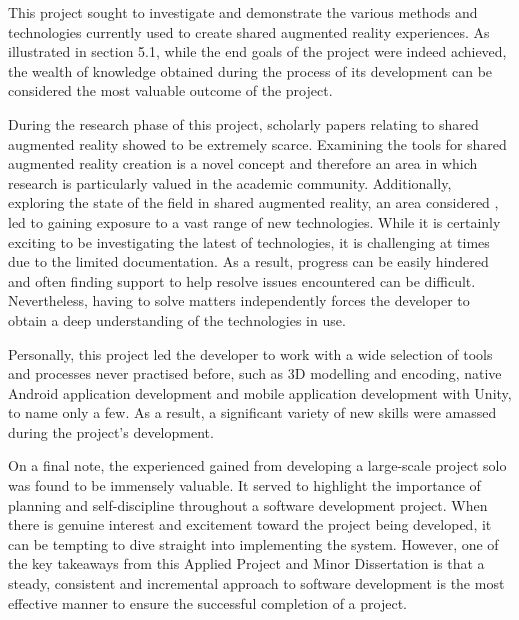 This project sought to investigate and demonstrate the various methods and technologies currently used to create shared augmented reality experiences. As illustrated in section 5.1, while the end goals of the project were indeed achieved, the wealth of knowledge obtained during the process of its development can be considered the most valuable outcome of the project. 

During the research phase of this project, scholarly papers relating to shared augmented reality showed to be extremely scarce. Examining the tools for shared augmented reality creation is a novel concept and therefore an area in which research is particularly valued in the academic community. Additionally, exploring the state of the field in shared augmented reality, an area considered , led to gaining exposure to a vast range of new technologies. While it is certainly exciting to be investigating the latest of technologies, it is challenging at times due to the limited documentation.  As a result, progress can be easily hindered and often finding support to help resolve issues encountered can be difficult. Nevertheless, having to solve matters independently forces the developer to obtain a deep understanding of the technologies in use. 

Personally, this project led the developer to work with a wide selection of tools and processes never practised before, such as 3D modelling and encoding, native Android application development and mobile application development with Unity, to name only a few. As a result, a significant variety of new skills were amassed during the project’s development. 

On a final note, the experienced gained from developing a large-scale project solo was found to be immensely valuable. It served to highlight the importance of planning and self-discipline throughout a software development project. When there is genuine interest and excitement toward the project being developed, it can be tempting to dive straight into implementing the system. However, one of the key takeaways from this Applied Project and  Minor Dissertation is that a steady, consistent and incremental approach to software development is the most effective manner to ensure the successful completion of a project.

